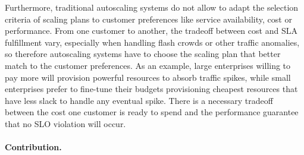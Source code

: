 
Furthermore, traditional autoscaling systems do not allow to adapt the
selection criteria of scaling plans to customer preferences like
service availability, cost or performance. From one customer to
another, the tradeoff between cost and SLA fulfillment vary,
especially when handling flash crowds or other traffic anomalies, so
therefore autoscaling systems have to choose the scaling plan that
better match to the customer preferences. As an example, large
enterprises willing to pay more will provision powerful resources to
absorb traffic spikes, while small enterprises prefer to fine-tune
their budgets provisioning cheapest resources that have less slack to
handle any eventual spike. There is a necessary tradeoff between the
cost one customer is ready to spend and the performance guarantee that
no SLO violation will occur.







\paragraph{Contribution.}  

